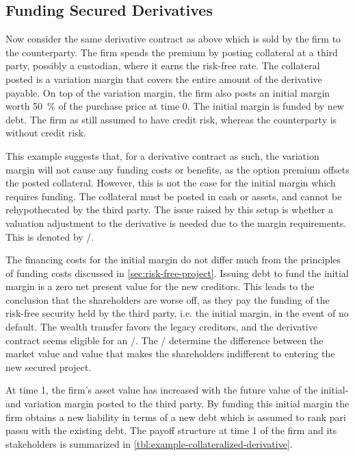 \documentclass[../main.tex]{subfiles}
\begin{document}
    \subsection{Funding Secured Derivatives}
    \label{sec:example-secured-derivative}
        Now consider the same derivative contract as above which is sold by the firm to the counterparty.
        The firm spends the premium by posting collateral at a third party, possibly a custodian, where it earns the risk-free rate.
        The collateral posted is a variation margin that covers the entire amount of the derivative payable.
        On top of the variation margin, the firm also posts an initial margin worth 
        \qty[round-precision=0]{50}{\percent} of the purchase price at time 0.
        The initial margin is funded by new debt.
        The firm as still assumed to have credit risk, whereas the counterparty is without credit risk.


        This example suggests that, for a derivative contract as such,
        the variation margin will not cause any funding costs or benefits,
        as the option premium offsets the posted collateral.
        However, this is not the case for the initial margin which requires funding.
        The collateral must be posted in cash or assets, and cannot be rehypothecated by the third party.
        The issue raised by this setup is whether a valuation adjustment to the derivative is needed due to the margin requirements.
        This is denoted by \MVA/.

        The financing costs for the initial margin do not differ much from the principles of funding costs discussed in \cref{sec:risk-free-project}.
        Issuing debt to fund the initial margin is a zero net present value for the new creditors.
        This leads to the conclusion that the shareholders are worse off, as they pay the funding of the risk-free security held by the third party, i.e. the initial margin, in the event of no default.
        The wealth transfer favors the legacy creditors,
        and the derivative contract seems eligible for an \MVA/.
        The \MVA/ determine the difference between the market value and value that makes the shareholders indifferent to entering the new secured project.

        At time 1, the firm's asset value has increased with the future value of the initial- and variation margin posted to the third party.
        By funding this initial margin the firm obtains a new liability in terms of a new debt which is assumed to rank pari passu with the existing debt.
        The payoff structure at time 1 of the firm and its stakeholders
        is summarized in \cref{tbl:example-collateralized-derivative}.
\end{document}
